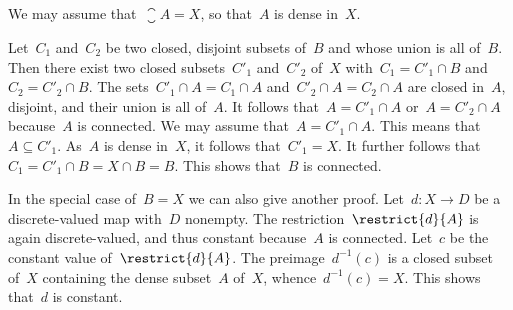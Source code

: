\subsection{}

We may assume that~$\closure{A} = X$, so that~$A$ is dense in~$X$.

Let~$C_1$ and~$C_2$ be two closed, disjoint subsets of~$B$ and whose union is all of~$B$.
Then there exist two closed subsets~$C'_1$ and~$C'_2$ of~$X$ with~$C_1 = C'_1 ∩ B$ and~$C_2 = C'_2 ∩ B$.
The sets~$C'_1 ∩ A = C_1 ∩ A$ and~$C'_2 ∩ A = C_2 ∩ A$ are closed in~$A$, disjoint, and their union is all of~$A$.
It follows that~$A = C'_1 ∩ A$ or~$A = C'_2 ∩ A$ because~$A$ is connected.
We may assume that~$A = C'_1 ∩ A$.
This means that~$A ⊆ C'_1$.
As~$A$ is dense in~$X$, it follows that~$C'_1 = X$.
It further follows that~$C_1 = C'_1 ∩ B = X ∩ B = B$.
This shows that~$B$ is connected.

In the special case of~$B = X$ we can also give another proof.
Let~$d \colon X \to D$ be a discrete-valued map with~$D$ nonempty.
The restriction~$\restrict{d}{A}$ is again discrete-valued, and thus constant because~$A$ is connected.
Let~$c$ be the constant value of~$\restrict{d}{A}$.
The preimage~$d^{-1}(c)$ is a closed subset of~$X$ containing the dense subset~$A$ of~$X$, whence~$d^{-1}(c) = X$.
This shows that~$d$ is constant.
